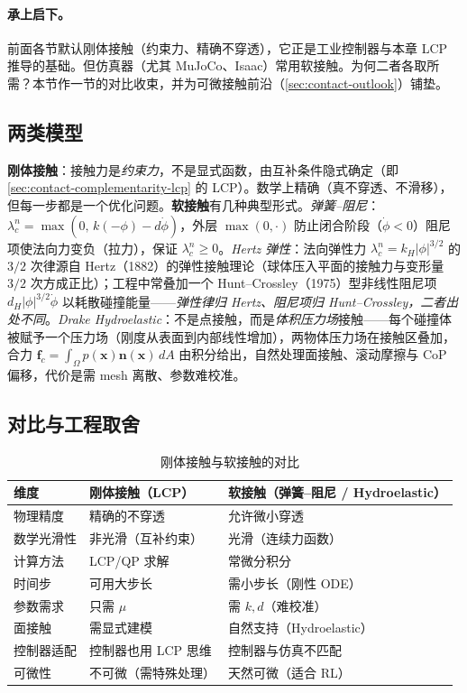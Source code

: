 \paragraph{承上启下。}
前面各节默认刚体接触（约束力、精确不穿透），它正是工业控制器与本章 LCP 推导的基础。但仿真器（尤其 MuJoCo、Isaac）常用软接触。为何二者各取所需？本节作一节的对比收束，并为可微接触前沿（\cref{sec:contact-outlook}）铺垫。

\subsection{两类模型}
\label{subsec:two-models}

\textbf{刚体接触}：接触力是\emph{约束力}，不是显式函数，由互补条件隐式确定（即 \cref{sec:contact-complementarity-lcp} 的 LCP）。数学上精确（真不穿透、不滑移），但每一步都是一个优化问题。\textbf{软接触}有几种典型形式。\emph{弹簧--阻尼}：$\lambda_c^n=\max(0,\,k(-\phi)-d\dot\phi)$，外层 $\max(0,\cdot)$ 防止闭合阶段（$\dot\phi<0$）阻尼项使法向力变负（拉力），保证 $\lambda_c^n\ge0$。\emph{Hertz 弹性}：法向弹性力 $\lambda_c^n=k_H|\phi|^{3/2}$ 的 $3/2$ 次律源自 Hertz（1882）的弹性接触理论\cite{hertz1882beruhrung}（球体压入平面的接触力与变形量 $3/2$ 次方成正比）；工程中常叠加一个 Hunt--Crossley（1975）型非线性阻尼项 $d_H|\phi|^{3/2}\dot\phi$ 以耗散碰撞能量\cite{hunt1975coefficient}——\emph{弹性律归 Hertz、阻尼项归 Hunt--Crossley，二者出处不同}。\emph{Drake Hydroelastic}：不是点接触，而是\emph{体积压力场}接触\cite{masterjohn2022velocity}——每个碰撞体被赋予一个压力场（刚度从表面到内部线性增加），两物体压力场在接触区叠加，合力 $\boldsymbol{f}_c=\int_{\Omega}p(\boldsymbol{x})\boldsymbol{n}(\boldsymbol{x})\,dA$ 由积分给出，自然处理面接触、滚动摩擦与 CoP 偏移，代价是需 mesh 离散、参数难校准。

\subsection{对比与工程取舍}
\label{subsec:model-compare}

\begin{table}[H]\centering\small
\caption{刚体接触与软接触的对比}
\label{tab:rigid-vs-soft}
\begin{tabular}{lll}
\toprule
维度 & 刚体接触（LCP）& 软接触（弹簧--阻尼 / Hydroelastic）\\
\midrule
物理精度 & 精确的不穿透 & 允许微小穿透 \\
数学光滑性 & 非光滑（互补约束）& 光滑（连续力函数）\\
计算方法 & LCP/QP 求解 & 常微分积分 \\
时间步 & 可用大步长 & 需小步长（刚性 ODE）\\
参数需求 & 只需 $\mu$ & 需 $k,d$（难校准）\\
面接触 & 需显式建模 & 自然支持（Hydroelastic）\\
控制器适配 & 控制器也用 LCP 思维 & 控制器与仿真不匹配 \\
可微性 & 不可微（需特殊处理）& 天然可微（适合 RL）\\
\bottomrule
\end{tabular}
\end{table}

